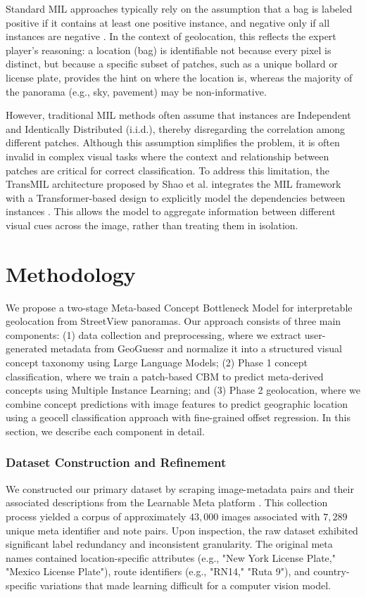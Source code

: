 \documentclass{article}
\begin{document}
Standard MIL approaches typically rely on the assumption that a bag is labeled positive if it contains at least one positive instance, and negative only if all instances are negative \cite{Dietterich1997SolvingTM}. In the context of geolocation, this reflects the expert player's reasoning: a location (bag) is identifiable not because every pixel is distinct, but because a specific subset of patches, such as a unique bollard or license plate, provides the hint on where the location is, whereas the majority of the panorama (e.g., sky, pavement) may be non-informative.

However, traditional MIL methods often assume that instances are Independent and Identically Distributed (i.i.d.), thereby disregarding the correlation among different patches. Although this assumption simplifies the problem, it is often invalid in complex visual tasks where the context and relationship between patches are critical for correct classification. To address this limitation, the TransMIL architecture proposed by Shao et al. integrates the MIL framework with a Transformer-based design to explicitly model the dependencies between instances \cite{shao2021transmiltransformerbasedcorrelated}. This allows the model to aggregate information between different visual cues across the image, rather than treating them in isolation.


\section{Methodology}
We propose a two-stage Meta-based Concept Bottleneck Model for interpretable geolocation from StreetView panoramas. Our approach consists of three main components: (1) data collection and preprocessing, where we extract user-generated metadata from GeoGuessr and normalize it into a structured visual concept taxonomy using Large Language Models; (2) Phase 1 concept classification, where we train a patch-based CBM to predict meta-derived concepts using Multiple Instance Learning; and (3) Phase 2 geolocation, where we combine concept predictions with image features to predict geographic location using a geocell classification approach with fine-grained offset regression. In this section, we describe each component in detail.


\subsubsection{Dataset Construction and Refinement}
We constructed our primary dataset by scraping image-metadata pairs and their associated descriptions from the Learnable Meta platform \cite{LearnableMeta2025}. This collection process yielded a corpus of approximately $43,000$ images associated with $7,289$ unique meta identifier and note pairs.
Upon inspection, the raw dataset exhibited significant label redundancy and inconsistent granularity. The original meta names contained location-specific attributes (e.g., "New York License Plate," "Mexico License Plate"), route identifiers (e.g., "RN14," "Ruta 9"), and country-specific variations that made learning difficult for a computer vision model.
\end{document}
